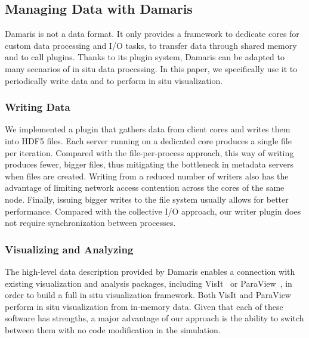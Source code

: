 \subsection{Managing Data with Damaris}

Damaris is not a data format. It only provides a framework to
dedicate cores for custom data processing and I/O tasks, to transfer data through shared memory and to call plugins.
Thanks to its plugin system, Damaris can be adapted to many scenarios of in situ data processing.
In this paper, we specifically use it to periodically write data and to perform in situ visualization.

\subsubsection{Writing Data}

We implemented a plugin that gathers data from client cores and writes
them into HDF5 files. Each server running on a dedicated core produces a single file per iteration.
Compared with the file-per-process approach, this way of writing produces fewer, bigger files, thus
mitigating the bottleneck in metadata servers when files are created. Writing from a reduced
number of writers also has the advantage of limiting network access contention across the cores of
the same node. Finally, issuing bigger writes to the file system usually allows for better performance.
Compared with the collective I/O approach, our writer plugin does not require synchronization between
processes.

\subsubsection{Visualizing and Analyzing}

The high-level data description provided by Damaris enables a connection with  
existing visualization and analysis packages, including VisIt~\cite{visit} or ParaView~\cite{paraview}, in order to build 
a full in situ visualization framework.
Both VisIt and ParaView perform in situ visualization from in-memory data. 
Given that each of these software has strengths, a major advantage of
our approach is the ability to switch between them with no code modification in the simulation.
%

